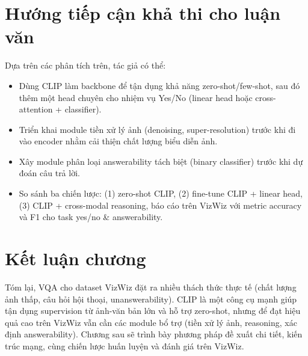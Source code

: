 \section{Hướng tiếp cận khả thi cho luận văn}
Dựa trên các phân tích trên, tác giả có thể:
\begin{itemize}
    \item Dùng CLIP làm backbone để tận dụng khả năng zero-shot/few-shot, sau đó thêm một head chuyên cho nhiệm vụ Yes/No (linear head hoặc cross-attention + classifier).
    \item Triển khai module tiền xử lý ảnh (denoising, super-resolution) trước khi đi vào encoder nhằm cải thiện chất lượng biểu diễn ảnh.
    \item Xây module phân loại answerability tách biệt (binary classifier) trước khi dự đoán câu trả lời.
    \item So sánh ba chiến lược: (1) zero-shot CLIP, (2) fine-tune CLIP + linear head, (3) CLIP + cross-modal reasoning, báo cáo trên VizWiz với metric accuracy và F1 cho task yes/no & answerability.
\end{itemize}

\section{Kết luận chương}
Tóm lại, VQA cho dataset VizWiz đặt ra nhiều thách thức thực tế (chất lượng ảnh thấp, câu hỏi hội thoại, unanswerability). CLIP là một công cụ mạnh giúp tận dụng supervision từ ảnh-văn bản lớn và hỗ trợ zero-shot, nhưng để đạt hiệu quả cao trên VizWiz vẫn cần các module bổ trợ (tiền xử lý ảnh, reasoning, xác định answerability). Chương sau sẽ trình bày phương pháp đề xuất chi tiết, kiến trúc mạng, cùng chiến lược huấn luyện và đánh giá trên VizWiz.
